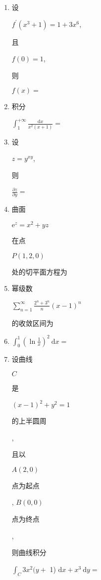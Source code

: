 \documentclass[10pt]{article}
\begin{document}
\begin{enumerate}
  \item \begin{CJK}{UTF8}{mj}设\end{CJK} $f^{\prime}\left(x^{3}+1\right)=1+3 x^{6}$, \begin{CJK}{UTF8}{mj}且\end{CJK} $f(0)=1$, \begin{CJK}{UTF8}{mj}则\end{CJK} $f(x)=$

  \item \begin{CJK}{UTF8}{mj}积分\end{CJK} $\int_{1}^{+\infty} \frac{\mathrm{d} x}{x^{2}(x+1)}=$

  \item \begin{CJK}{UTF8}{mj}设\end{CJK} $z=y^{x y}$, \begin{CJK}{UTF8}{mj}则\end{CJK} $\frac{\partial z}{\partial y}=$

  \item \begin{CJK}{UTF8}{mj}曲面\end{CJK} $\mathrm{e}^{z}=x^{2}+y z$ \begin{CJK}{UTF8}{mj}在点\end{CJK} $P(1,2,0)$ \begin{CJK}{UTF8}{mj}处的切平面方程为\end{CJK}

  \item \begin{CJK}{UTF8}{mj}幂级数\end{CJK} $\sum_{n=1}^{\infty} \frac{2^{n}+3^{n}}{n}(x-1)^{n}$ \begin{CJK}{UTF8}{mj}的收敛区间为\end{CJK}

  \item $\int_{0}^{1}\left(\ln \frac{1}{x}\right)^{2} \mathrm{~d} x=$

  \item \begin{CJK}{UTF8}{mj}设曲线\end{CJK} $C$ \begin{CJK}{UTF8}{mj}是\end{CJK} $(x-1)^{2}+y^{2}=1$ \begin{CJK}{UTF8}{mj}的上半圆周\end{CJK}, \begin{CJK}{UTF8}{mj}且以\end{CJK} $A(2,0)$ \begin{CJK}{UTF8}{mj}点为起点\end{CJK}, $B(0,0)$ \begin{CJK}{UTF8}{mj}点为终点\end{CJK}, \begin{CJK}{UTF8}{mj}则曲线积分\end{CJK} $\int_{C} 3 x^{2}(y+$ 1) $\mathrm{d} x+x^{3} \mathrm{~d} y=$


\end{enumerate}
\end{document}
